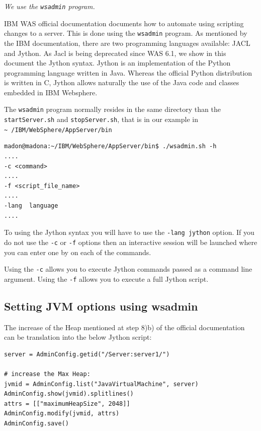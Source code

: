 \documentclass[10pt,a4]{article}
\newenvironment{faster}{{\bf {\color{red}We do it FASTER:}} \em}{\par\normalfont}%
\begin{document}
\begin{faster}
We use the {\tt wsadmin} program.
\end{faster}

IBM WAS official documentation documents\cite{wsadminjython} how to automate using scripting changes to a server.
This is done using the {\tt wsadmin} program. As mentioned by the IBM documentation, there are two programming languages available: JACL and Jython. As Jacl is being deprecated\cite{wsadminjython} since WAS 6.1, we show in this document the Jython syntax. Jython \cite{jython} is an implementation of the Python programming language written in Java. Whereas the official Python distribution is written in C, Jython allows naturally the use of the Java code and classes embedded in IBM Websphere.

The {\tt wsadmin} program normally resides in the same directory than the {\tt startServer.sh} and {\tt stopServer.sh}, that is in our example in {\tt \textasciitilde\ /IBM/WebSphere/AppServer/bin}

\begin{verbatim}
madon@madona:~/IBM/WebSphere/AppServer/bin$ ./wsadmin.sh -h
....
-c <command>
....
-f <script_file_name>
....
-lang  language
....
\end{verbatim}
To using the Jython syntax you will have to use the {\tt -lang jython} option.
If you do not use the {\tt -c} or {\tt -f} options then an interactive session will be launched where you can enter one by on each of the commands.

Using the  {\tt -c}  allows you to execute Jython commands passed as a command line argument.
Using the  {\tt -f}  allows you to execute a full Jython script.

\subsection{Setting JVM options using wsadmin}

The increase of the Heap mentioned at step 8)b) of the official documentation can be translation into the below Jython script:

\begin{verbatim}
server = AdminConfig.getid("/Server:server1/")

# increase the Max Heap:
jvmid = AdminConfig.list("JavaVirtualMachine", server)
AdminConfig.show(jvmid).splitlines()
attrs = [["maximumHeapSize", 2048]]
AdminConfig.modify(jvmid, attrs)
AdminConfig.save()
\end{verbatim}
\end{document}
